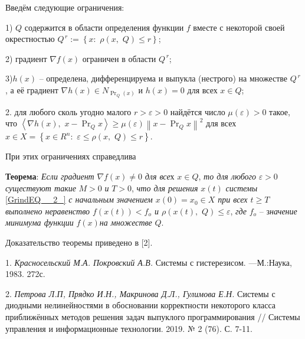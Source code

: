  Введём следующие ограничения:

1) $Q$ содержится в области определения функции $f$ вместе с некоторой своей окрестностью $Q^{\, r} :=\left\{x:\, \, \rho \left(x,\, \, Q\right)\le r\right\}$;

2) градиент $\nabla f\left(x\right)$ ограничен в области $Q^{\, r} $;

3)$h\left(x\right)$ -- определена, дифференцируема и выпукла (нестрого) на множестве \textit{$Q^{\, r} $}, а её градиент $\nabla h\left(x\right)\in N_{\Pr _{Q} \left(x\right)} $ и $h\left(x\right)=0$ для всех $x\in Q$;

2. для любого сколь угодно малого \textit{$r>\varepsilon >0$} найдётся число $\mu \left(\varepsilon \right)>0$ такое, что $\left\langle \nabla h\left(x\right),\, \, x-\Pr _{Q} x\right\rangle \ge \mu \left(\varepsilon \right)\left\| x-\Pr _{Q} x\right\| ^{2} $ для всех $x\in X=\left\{x\in R^{n} :\, \, \varepsilon \le \rho \left(x,\, \, Q\right)\le r\right\}$.

При этих ограничениях справедлива

\textbf{Теорема}: \textit{Если градиент }$\nabla f\left(x\right)\ne 0$\textit{ для все}х $x\in Q$, \textit{то для любого }$\varepsilon >0$\textit{ существуют такие }$M>0$\textit{ и }$T>0$, \textit{что для решения }$x\left(t\right)$\textit{ системы }\eqref{GrindEQ__2_}\textit{ с начальным значением $x\left(0\right)=x_{0} \in X$ при всех $t\ge T$ выполнено неравенство $f\left(x\left(t\right)\right)<f_{o} $ и $\rho \left(x\left(t\right),\, \, Q\right)\le \varepsilon $}, \textit{где }$f_{o} $ -- з\textit{начение минимума функции }$f\left(x\right)$\textit{на множестве }$Q$.

 Доказательство теоремы приведено в [2].

\litlist

1.
{\it Красносельский М.А. Покровский А.В.} Системы с гистерезисом. ---М.:Наука, 1983. 272с.

2.
{\it  Петрова Л.П, Прядко И.Н., Макринова Д.Л., Гулимова Е.Н.} Системы с диодными нелинейностями в обосновании корректности некоторого класса приближённых методов решения задач выпуклого программирования  // Системы управления и информационные технологии. 2019. № 2 (76). С. 7-11.


